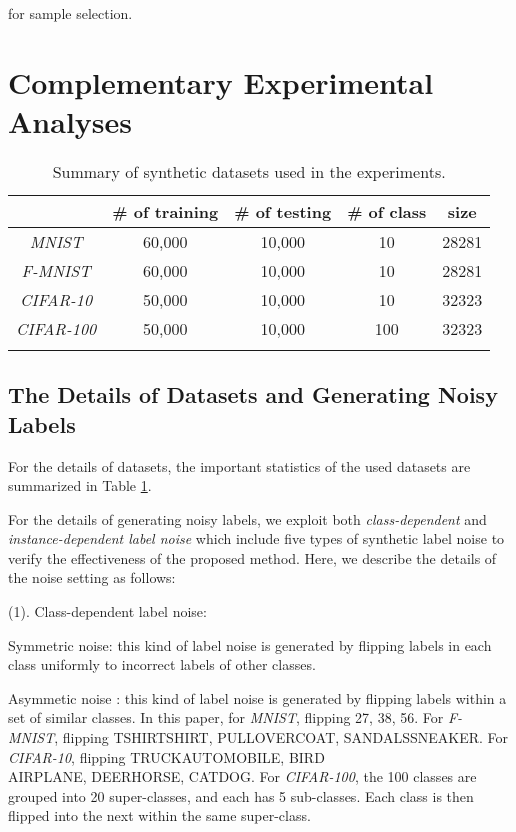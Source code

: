 \documentclass[11pt]{article}
\begin{document}
for sample selection.




\section{Complementary Experimental Analyses}


\begin{table}[!htbp]
    \centering
    \begin{tabular}{c|c|c|c|c}
    \Xhline{2\arrayrulewidth}	 
         &\# of training&\# of testing&\# of class & size\\
         \hline
         \textit{MNIST} & 60,000 & 10,000 & 10 & 28281\\
         \hline
         \textit{F-MNIST}  & 60,000 & 10,000 & 10 & 28281\\
         \hline
         \textit{CIFAR-10} & 50,000 & 10,000 & 10 & 32323\\
         \hline
         \textit{CIFAR-100}  & 50,000 & 10,000 & 100 & 32323\\
    \Xhline{2\arrayrulewidth}	 
    \end{tabular}
    \caption{Summary of synthetic datasets used in the experiments.}
    \label{tab:syn_dataset}
\end{table}



\subsection{The Details of Datasets and Generating Noisy Labels}
For the details of datasets, the important statistics of the used datasets are summarized in Table \ref{tab:syn_dataset}.

For the details of generating noisy labels, we exploit both \textit{class-dependent} and \textit{instance-dependent label noise} which include five types of synthetic label noise to verify the effectiveness of the proposed method. Here, we describe the details of the noise setting as follows: 

(1). Class-dependent label noise: 

 Symmetric noise: this kind of label noise is generated by flipping labels in each class uniformly to incorrect labels of other classes.

 Asymmetic noise : this kind of label noise is generated by flipping labels within a set of similar classes. In this paper, for \textit{MNIST}, flipping 27, 38, 56. For \textit{F-MNIST}, flipping TSHIRTSHIRT, PULLOVERCOAT, SANDALSSNEAKER. For \textit{CIFAR-10}, flipping TRUCKAUTOMOBILE, BIRD\\AIRPLANE, DEERHORSE, CATDOG. For \textit{CIFAR-100}, the 100 classes are grouped into 20 super-classes, and each has 5 sub-classes. Each class is then flipped into the next within the same super-class. 
\end{document}
